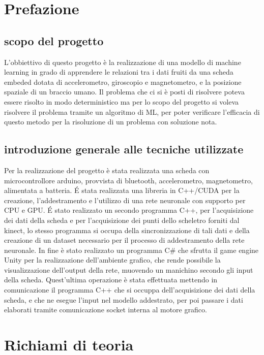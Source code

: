 \documentclass[10pt,a4paper]{article}
\begin{document}
\section{Prefazione}
 
\subsection{scopo del progetto}
L'obbiettivo di questo progetto \`e la realizzazione di una modello di machine learning in grado di apprendere le relazioni tra i dati fruiti da una scheda embeded dotata di accelerometro, giroscopio e magnetometro, e la posizione spaziale di un braccio umano.
Il problema che ci si \`e posti di risolvere poteva essere risolto in modo deterministico ma per lo scopo del progetto si voleva risolvere il problema tramite un algoritmo di ML, per poter verificare l'efficacia di questo metodo per la risoluzione di un problema con soluzione nota.


\subsection{introduzione generale alle tecniche utilizzate}
Per la realizzazione del progetto è stata realizzata una scheda con microcontrollore arduino, provvista di bluetooth, accelerometro, magnetometro, alimentata a batteria.
\'E stata realizzata una libreria in C++/CUDA per la creazione, l'addestramento e l'utilizzo di una rete neuronale con supporto per CPU e GPU.
\'E stato realizzato un secondo programma C++, per l'acquisizione dei dati della scheda e per l'acquisizione dei punti dello scheletro forniti dal kinect, lo stesso programma si occupa della sincronizzazione di tali dati e della creazione di un dataset necessario per il processo di addestramento della rete neuronale.
In fine è stato realizzato un programma C\# che sfrutta il game engine Unity per la realizzazione dell'ambiente grafico, che rende possibile la visualizzazione dell'output della rete, muovendo un manichino secondo gli input della scheda.
Quest'ultima operazione è stata effettuata mettendo in comunicazione il programma C++ che si occuppa dell'acquisizione dei dati della scheda, e che ne esegue l'input nel modello addestrato, per poi passare i dati elaborati tramite comunicazione socket interna al motore grafico.       

\section{Richiami di teoria}
\end{document}
